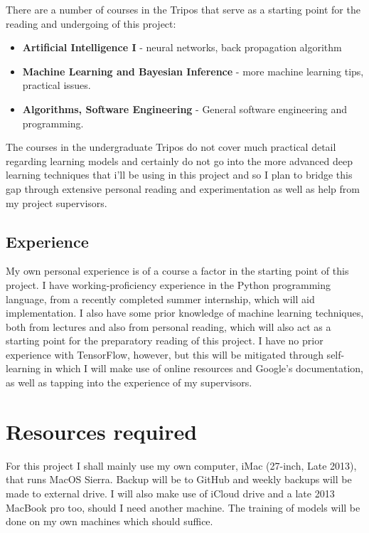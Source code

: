 \documentclass[12pt,a4paper,twoside]{article}
\begin{document}
 There are a number of courses in the Tripos that serve as a starting point for the reading and undergoing of this project:

\begin{itemize}
\item
	\textbf{Artificial Intelligence I} - neural networks, back propagation algorithm
\item
	\textbf{Machine Learning and Bayesian Inference} - more machine learning tips, practical issues.
\item
	\textbf{Algorithms, Software Engineering} - General software engineering and programming.
\end{itemize}

The courses in the undergraduate Tripos do not cover much practical detail regarding learning models and certainly do not go into the more advanced deep learning techniques that i'll be using in this project and so I plan to bridge this gap through extensive personal reading and experimentation as well as help from my project supervisors.

\subsection*{Experience}
My own personal experience is of a course a factor in the starting point of this project. I have working-proficiency experience in the Python programming language, from a recently completed summer internship, which will aid implementation. I also have some prior knowledge of machine learning techniques, both from lectures and also from personal reading, which will also act as a starting point for the preparatory reading of this project. I have no prior experience with TensorFlow, however, but this will be mitigated through self-learning in which I will make use of online resources and Google's documentation, as well as tapping into the experience of my supervisors.

\section*{Resources required}

For this project I shall mainly use my own computer, iMac (27-inch, Late 2013), that
runs MacOS Sierra. Backup will be to GitHub and weekly backups will be made to external drive. I will also make use of iCloud drive and a late 2013 MacBook pro too, should I need another machine. 
The training of models will be done on my own machines which should suffice. 
\end{document}
